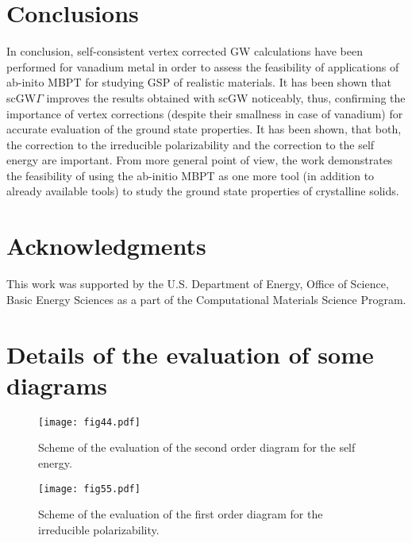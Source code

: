 \documentclass[aps,prb,floatfix,epsfig,twocolumn,preprintnumbers]{revtex4}
\begin{document}
\section*{Conclusions}
\label{concl}

In conclusion, self-consistent vertex corrected GW calculations have been performed for vanadium metal in order to assess the feasibility of applications of ab-inito MBPT for studying GSP of realistic materials. It has been shown that scGW$\Gamma$ improves the results obtained with scGW noticeably, thus, confirming the importance of vertex corrections (despite their smallness in case of vanadium) for accurate evaluation of the ground state properties. It has been shown, that both, the correction to the irreducible polarizability and the correction to the self energy are important. From more general point of view, the work demonstrates the feasibility of using the ab-initio MBPT as one more tool (in addition to already available tools) to study the ground state properties of crystalline solids.


\section*{Acknowledgments}
\label{ackn}


This work was   supported by the U.S. Department of Energy, Office of Science, Basic
Energy Sciences as a part of the Computational Materials Science Program.




\appendix

\section{Details of the evaluation of some diagrams}\label{diag_det}




\begin{figure}[t]
\centering
\texttt{[image: fig44.pdf]}
\caption{Scheme of the evaluation of the second order diagram for the self energy.}
\label{sigma_steps}
\end{figure}




\begin{figure}[b]
\centering
\texttt{[image: fig55.pdf]}
\caption{Scheme of the evaluation of the first order diagram for the irreducible polarizability.}
\label{p_steps}
\end{figure}
\end{document}
